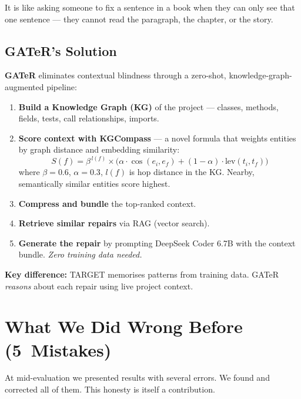 \documentclass[11pt,a4paper]{article}
\begin{document}
It is like asking someone to fix a sentence in a book when they can
only see that one sentence --- they cannot read the paragraph, the
chapter, or the story.

\subsection{GATeR's Solution}

\textbf{GATeR} eliminates contextual blindness through a zero-shot,
knowledge-graph-augmented pipeline:

\begin{enumerate}[nosep,leftmargin=1.5em]
  \item \textbf{Build a Knowledge Graph (KG)} of the project ---
        classes, methods, fields, tests, call relationships, imports.
  \item \textbf{Score context with KGCompass} --- a novel formula
        that weights entities by graph distance and embedding similarity:
        $$S(f) = \beta^{\,l(f)} \times \bigl(\alpha \cdot
        \cos(e_i, e_f) + (1{-}\alpha) \cdot \text{lev}(t_i, t_f)\bigr)$$
        where $\beta{=}0.6$, $\alpha{=}0.3$, $l(f)$ is hop distance
        in the KG.  Nearby, semantically similar entities score highest.
  \item \textbf{Compress and bundle} the top-ranked context.
  \item \textbf{Retrieve similar repairs} via RAG (vector search).
  \item \textbf{Generate the repair} by prompting DeepSeek Coder 6.7B
        with the context bundle.  \textit{Zero training data needed.}
\end{enumerate}

\textbf{Key difference:} TARGET memorises patterns from training data.
GATeR \textit{reasons} about each repair using live project context.

\section{What We Did Wrong Before (5~Mistakes)}

At mid-evaluation we presented results with several errors.
We found and corrected all of them.  This honesty is itself a
contribution.
\end{document}
